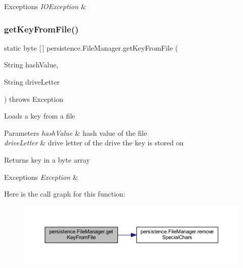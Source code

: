 \begin{DoxyExceptions}{Exceptions}
{\em I\+O\+Exception} & \\
\hline
\end{DoxyExceptions}
\mbox{\label{classpersistence_1_1_file_manager_adcb4a47e8759e6fa7560fd5c98d26be9}} 
\subsubsection{\texorpdfstring{get\+Key\+From\+File()}{getKeyFromFile()}}
{\footnotesize\ttfamily static byte \mbox{[}$\,$\mbox{]} persistence.\+File\+Manager.\+get\+Key\+From\+File (\begin{DoxyParamCaption}\item[{String}]{hash\+Value,  }\item[{String}]{drive\+Letter }\end{DoxyParamCaption}) throws Exception\hspace{0.3cm}{\ttfamily [static]}}

Loads a key from a file 
\begin{DoxyParams}{Parameters}
{\em hash\+Value} & hash value of the file \\
\hline
{\em drive\+Letter} & drive letter of the drive the key is stored on \\
\hline
\end{DoxyParams}
\begin{DoxyReturn}{Returns}
key in a byte array 
\end{DoxyReturn}

\begin{DoxyExceptions}{Exceptions}
{\em Exception} & \\
\hline
\end{DoxyExceptions}
Here is the call graph for this function\+:\nopagebreak
\begin{figure}[H]
\begin{center}
\leavevmode
\includegraphics[width=350pt]{classpersistence_1_1_file_manager_adcb4a47e8759e6fa7560fd5c98d26be9_cgraph}
\end{center}
\end{figure}
\mbox{\label{classpersistence_1_1_file_manager_a4600d8fe734a758688b9b41688862aac}} 
